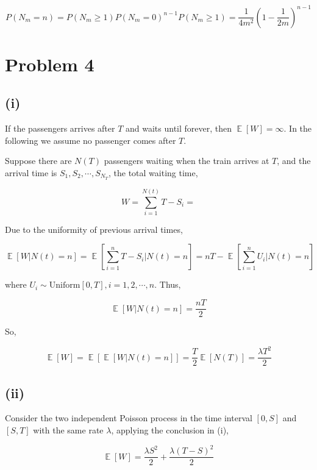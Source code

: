 \documentclass{article}
\DeclareMathOperator{\E}{\mathbb{E}}
\begin{document}
\begin{equation}
    P(N_m = n) = P(N_m \geqslant 1) P(N_m = 0)^{n-1} P(N_m \geqslant 1) = \frac{1}{4 m^2} \left(1-\frac{1}{2m}\right)^{n-1}
\end{equation}

\section{Problem 4}

\subsection{(i)}

If the passengers arrives after $T$ and waits until forever, then $\E[W] = \infty$. In the following we assume no passenger comes after $T$. 


Suppose there are $N(T)$ passengers waiting when the train arrives at $T$, and the arrival time is $S_1,S_2,\cdots,S_{N_T}$, the total waiting time,

\begin{equation}
    W = \sum_{i=1}^{N(t)} T-S_i = 
\end{equation}

Due to the uniformity of previous arrival times,

\begin{equation}
    \E[W|N(t) = n] = \E[\sum_{i=1}^{n} T-S_i | N(t) = n] = nT - \E[\sum_{i=1}^n U_i | N(t) = n]
\end{equation}

where $U_i \sim \text{Uniform}[0,T],i = 1,2,\cdots,n$. Thus,

\begin{equation}
    \E[W|N(t) = n] = \frac{nT}{2} 
\end{equation}

So,

\begin{equation}
    \E[W] = \E[\E[W|N(t) = n]] = \frac{T}{2}\E[N(T)] = \frac{\lambda T^2}{2}
\end{equation}


\subsection{(ii)}

Consider the two independent Poisson process in the time interval $[0,S]$ and $[S,T]$ with the same rate $\lambda$, applying the conclusion in (i),


\begin{equation}
    \E[W] =  \frac{\lambda S^2 }{2} + \frac{\lambda (T-S)^2 }{2}
\end{equation}
\end{document}

